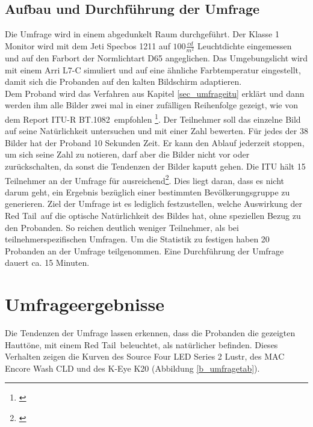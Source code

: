 \section{Aufbau und Durchführung der Umfrage} 
Die Umfrage wird in einem abgedunkelt Raum durchgeführt. Der Klasse 1 Monitor wird mit dem Jeti Specbos 1211 auf $100\frac{cd}{m^{2}}$ Leuchtdichte eingemessen und auf den Farbort der Normlichtart D65 angeglichen. Das Umgebungslicht wird mit einem Arri L7-C simuliert und  auf eine ähnliche Farbtemperatur eingestellt, damit sich die Probanden auf den kalten Bildschirm adaptieren.\\
Dem Proband wird das Verfahren aus Kapitel \ref{sec_umfrageitu}  erklärt und dann werden ihm alle Bilder zwei mal in einer zufälligen Reihenfolge gezeigt, wie von dem \glqq Report ITU-R BT.1082\grqq\ empfohlen \footnote{\cite[368]{itu90}}. Der Teilnehmer soll das einzelne Bild auf seine Natürlichkeit untersuchen und mit einer Zahl bewerten. Für jedes der 38 Bilder hat der Proband 10 Sekunden Zeit. Er kann den Ablauf jederzeit stoppen, um sich seine Zahl zu notieren, darf aber die Bilder nicht vor oder zurückschalten, da sonst die Tendenzen der Bilder kaputt gehen. Die ITU hält 15 Teilnehmer an der Umfrage für ausreichend\footnote{\cite[368]{itu90}}. Dies liegt daran, dass es nicht darum geht, ein Ergebnis bezüglich einer bestimmten Bevölkerungsgruppe zu generieren. Ziel der Umfrage ist es lediglich festzustellen, welche Auswirkung der \glqq Red Tail\grqq\ auf die optische Natürlichkeit des Bildes hat, ohne speziellen Bezug zu den Probanden. So reichen deutlich weniger Teilnehmer, als bei teilnehmerspezifischen Umfragen. Um die Statistik zu festigen haben 20 Probanden an der Umfrage teilgenommen. Eine Durchführung der Umfrage dauert ca. 15 Minuten.


\chapter{Umfrageergebnisse}
Die Tendenzen der Umfrage lassen erkennen, dass die Probanden die gezeigten Hauttöne, mit einem \glqq Red Tail\grqq\ beleuchtet, als natürlicher befinden. Dieses Verhalten zeigen die Kurven des Source Four LED Series 2 Lustr, des MAC Encore Wash CLD und des K-Eye K20 (Abbildung \ref{b_umfragetab}). 

